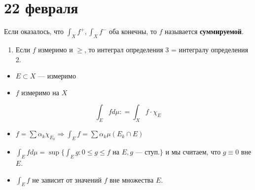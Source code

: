 \chapter{22 февраля}

\begin{definition}
    Если оказалось, что \(\int_X f^{ +}, \int_X f^{ -}\) оба конечны, то \(f\) называется \textbf{суммируемой}.
\end{definition}

\begin{remark}\itemfix
    \begin{enumerate}
        \item Если \(f\) измеримо и \( \geq \), то интеграл определения 3 = интегралу определения 2.
    \end{enumerate}
\end{remark}

\begin{definition}[4]\itemfix
    \begin{itemize}
        \item \(E\subset X\) --- измеримо
        \item \(f\) измеримо на \(X\)
    \end{itemize}
    \[\int_E f d\mu : = \int_X f \cdot \chi_E\]
\end{definition}

\begin{remark}\itemfix
    \begin{itemize}
        \item \(f = \sum \alpha_k \chi_{E_k} \Rightarrow \int_E f = \sum \alpha_k \mu (E_k\cap E)\)
        \item \(\int_E f d\mu = \sup \{\int_E g : 0 \leq g \leq f \text{ на } E, g \text{ --- ступ.}\} \) и мы считаем, что \(g \equiv 0\) вне \(E\).
        \item \(\int_E f\) не зависит от значений \(f\) вне множества \(E\).
    \end{itemize}
\end{remark}

